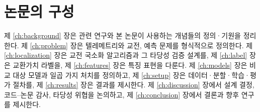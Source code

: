 
\section{논문의 구성}
\label{sec:intro-outline}

제 \ref{ch:background} 장은 관련 연구와 본 논문이 사용하는 개념들의 정의·기원을 정리한다. 제 \ref{ch:problem} 장은 텔레메트리와 교전, 예측 문제를 형식적으로 정의한다. 제 \ref{ch:localization} 장은 교전 국소화 알고리즘과 그 타당성 검증 설계를, 제 \ref{ch:label} 장은 교환가치 라벨을, 제 \ref{ch:features} 장은 특징 표현을 다룬다. 제 \ref{ch:models} 장은 비교 대상 모델과 일곱 가지 처치를 정의하고, 제 \ref{ch:setup} 장은 데이터·분할·학습·평가 절차를, 제 \ref{ch:results} 장은 결과를 제시한다. 제 \ref{ch:discussion} 장에서 설계 결정, 코드--논문 감사, 타당성 위협을 논의하고, 제 \ref{ch:conclusion} 장에서 결론과 향후 연구를 제시한다.
